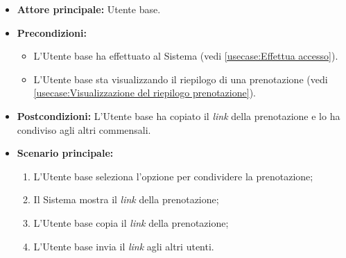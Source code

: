 \label{usecase:Condividi la prenotazione}
\begin{itemize}
	\item \textbf{Attore principale:} Utente base.

	\item \textbf{Precondizioni:}
	\begin{itemize}
		\item L'Utente base ha effettuato al Sistema (vedi \autoref{usecase:Effettua accesso}).
		\item L'Utente base sta visualizzando il riepilogo di una prenotazione (vedi \autoref{usecase:Visualizzazione del riepilogo prenotazione}).
	\end{itemize}

	\item \textbf{Postcondizioni:}
	      L'Utente base ha copiato il \textit{link} della prenotazione e lo ha condiviso agli altri commensali.

	\item \textbf{Scenario principale:}
	      \begin{enumerate}
		      \item L'Utente base seleziona l'opzione per condividere la prenotazione;
		      \item Il Sistema mostra il \textit{link} della prenotazione;
		      \item L'Utente base copia il \textit{link} della prenotazione;
		      \item L'Utente base invia il \textit{link} agli altri utenti.
	      \end{enumerate}
\end{itemize}